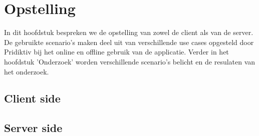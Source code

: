 
\chapter{Opstelling}
\label{ch:setup}


In dit hoofdstuk bespreken we de opstelling van zowel de client als van de server. De gebruikte scenario's maken deel uit van verschillende use cases opgesteld door Pridiktiv bij het online en offline gebruik van de applicatie. Verder in het hoofdstuk 'Onderzoek' worden verschillende scenario's belicht en de resulaten van het onderzoek.

\section{Client side}
\section{Server side}